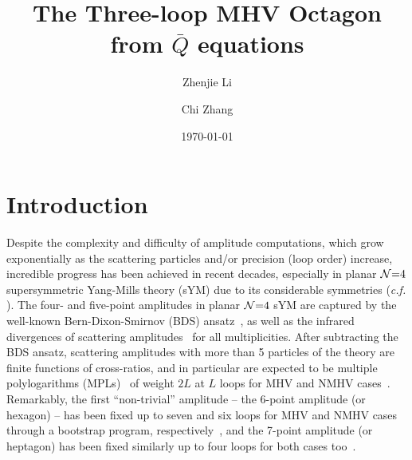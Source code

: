 \documentclass[a4paper,12pt]{article}
\begin{document}
\title{\Large The Three-loop MHV Octagon from $\bar{Q}$ equations}
\author[a,b]{Zhenjie Li}
\author[c]{Chi Zhang}%
%
%

\date{\today}%



\maketitle

\section{Introduction}
 
Despite the complexity and difficulty of amplitude computations, which grow exponentially as the scattering particles and/or precision (loop order) increase, incredible progress has been achieved in recent decades, especially in planar ${\cal N} {=} 4$ supersymmetric Yang-Mills theory (sYM) due to its considerable symmetries ({\it c.f.} \cite{Arkani-Hamed:2008owk,Roiban:2010kk,Drummond:2010km,Alday:2010kn}). The four- and five-point amplitudes in planar ${\cal N}{=}4$ sYM are captured by the well-known Bern-Dixon-Smirnov (BDS) ansatz~\cite{Bern:2005iz}, as well as the infrared divergences of scattering amplitudes~\cite{Anastasiou:2003kj} for all multiplicities. After subtracting the BDS ansatz, scattering amplitudes with more than 5 particles of the theory are finite functions of cross-ratios, and in particular are expected to be multiple polylogarithms (MPLs)~\cite{Goncharov:2005sla} of weight $2L$ at $L$ loops for MHV and NMHV cases~\cite{ArkaniHamed:2012nw}. Remarkably, the first ``non-trivial'' amplitude -- the 6-point amplitude (or hexagon) -- has been fixed up to seven and six loops for MHV and NMHV cases through a bootstrap program, respectively~\cite{Caron-Huot:2019vjl}, and the 7-point amplitude (or heptagon) has been fixed similarly up to four loops for both cases too~\cite{Dixon:2016nkn,Drummond:2018caf}.
\end{document}
